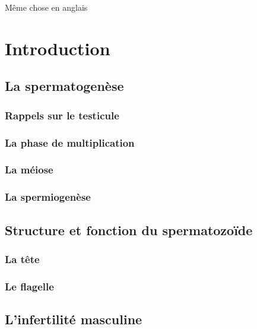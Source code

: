 \documentclass[12pt,twoside]{ugathesis}
\begin{document}
Même chose en anglais

\chapter{Introduction}\label{introInf}

\section{La spermatogenèse}\label{la-spermatogenese}

\subsection{Rappels sur le testicule}\label{rappels-sur-le-testicule}

\subsection{La phase de
multiplication}\label{la-phase-de-multiplication}

\subsection{La méiose}\label{meiose}

\subsection{La spermiogenèse}\label{spermiogenese}

\section{Structure et fonction du
spermatozoïde}\label{structure-et-fonction-du-spermatozoide}

\subsection{La tête}\label{la-tete}

\subsection{Le flagelle}\label{le-flagelle}

\section{L'infertilité masculine}\label{linfertilite-masculine}
\end{document}
